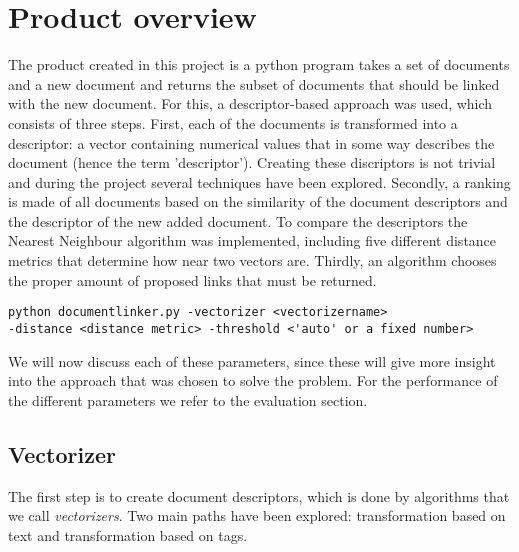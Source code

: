\section{Product overview}

The product created in this project is a python program takes a set of documents and a new document and returns the subset of documents that should be linked with the new document. For this, a descriptor-based approach was used, which consists of three steps. First, each of the documents is transformed into a descriptor: a vector containing numerical values that in some way describes the document (hence the term 'descriptor'). Creating these discriptors is not trivial and during the project several techniques have been explored. Secondly, a ranking is made of all documents based on the similarity of the document descriptors and the descriptor of the new added document. To compare the descriptors the Nearest Neighbour algorithm was implemented, including five different distance metrics that determine how near two vectors are. Thirdly, an algorithm chooses the proper amount of proposed links that must be returned.

\begin{lstlisting}
python documentlinker.py -vectorizer <vectorizername> 
-distance <distance metric> -threshold <'auto' or a fixed number>
\end{lstlisting}

We will now discuss each of these parameters, since these will give more insight into the approach that was chosen to solve the problem. For the performance of the different parameters we refer to the evaluation section. 

\subsection{Vectorizer}
The first step is to create document descriptors, which is done by algorithms that we call \emph{vectorizers}. Two main paths have been explored: transformation based on text and transformation based on tags.

